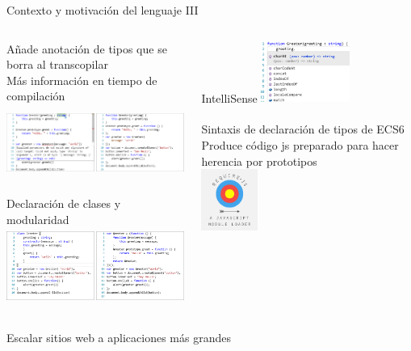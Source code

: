 \documentclass{beamer}
\begin{document}
\small
\begin{frame}{Contexto y motivación del lenguaje III}
\begin{columns}[t, onlytextwidth]
	\begin{column}[T]{.6\textwidth} %
		
		Añade anotación de tipos que se borra al transcopilar\\
		Más información en tiempo de compilación \\
		\includegraphics[height=2.5cm]{imagenes/ts5.png}
		
		Declaración de clases y modularidad \\
		\includegraphics[height=2.5cm]{imagenes/ts7.png}
		
		
	\end{column}
	\begin{column}[T]{0.3\textwidth} %
		IntelliSense
		\includegraphics[height=2cm]{imagenes/ts6.png} \\ 
		\hfill \break
		\\
		
		Sintaxis de declaración de tipos de ECS6 \\
		Produce código js preparado para hacer
		herencia por prototipos \\
		
		\includegraphics[height=2cm]{imagenes/ts8.png}
	
	\end{column}
\end{columns}
Escalar sitios web a aplicaciones más grandes

\end{frame}
\end{document}
